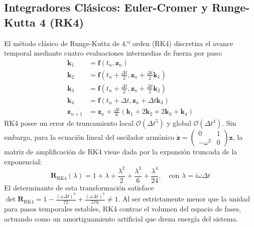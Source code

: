 \documentclass[11pt,a4paper]{article}
\begin{document}
\subsection{Integradores Clásicos: Euler-Cromer y Runge-Kutta 4 (RK4)}
El método clásico de Runge-Kutta de 4.º orden (RK4) discretiza el avance temporal mediante cuatro evaluaciones intermedias de fuerza por paso:
\begin{align}
    \mathbf{k}_1 &= \mathbf{f}(t_n, \mathbf{z}_n) \nonumber \\
    \mathbf{k}_2 &= \mathbf{f}\left(t_n + \frac{\Delta t}{2}, \mathbf{z}_n + \frac{\Delta t}{2}\mathbf{k}_1\right) \nonumber \\
    \mathbf{k}_3 &= \mathbf{f}\left(t_n + \frac{\Delta t}{2}, \mathbf{z}_n + \frac{\Delta t}{2}\mathbf{k}_2\right) \nonumber \\
    \mathbf{k}_4 &= \mathbf{f}\left(t_n + \Delta t, \mathbf{z}_n + \Delta t \mathbf{k}_3\right) \nonumber \\
    \mathbf{z}_{n+1} &= \mathbf{z}_n + \frac{\Delta t}{6}(\mathbf{k}_1 + 2\mathbf{k}_2 + 2\mathbf{k}_3 + \mathbf{k}_4)
\end{align}
RK4 posee un error de truncamiento local $\mathcal{O}(\Delta t^5)$ y global $\mathcal{O}(\Delta t^4)$. Sin embargo, para la ecuación lineal del oscilador armónico $\dot{\mathbf{z}} = \begin{pmatrix} 0 & 1 \\ -\omega^2 & 0 \end{pmatrix} \mathbf{z}$, la matriz de amplificación de RK4 viene dada por la expansión truncada de la exponencial:
\begin{equation}
    \mathbf{R}_{\text{RK4}}(\lambda) = 1 + \lambda + \frac{\lambda^2}{2} + \frac{\lambda^3}{6} + \frac{\lambda^4}{24}, \quad \text{con } \lambda = i\omega \Delta t
\end{equation}
El determinante de esta transformación satisface $\det \mathbf{R}_{\text{RK4}} = 1 - \frac{(\omega \Delta t)^6}{72} + \frac{(\omega \Delta t)^8}{576} \neq 1$. Al ser estrictamente menor que la unidad para pasos temporales estables, RK4 contrae el volumen del espacio de fases, actuando como un amortiguamiento artificial que drena energía del sistema.
\end{document}
